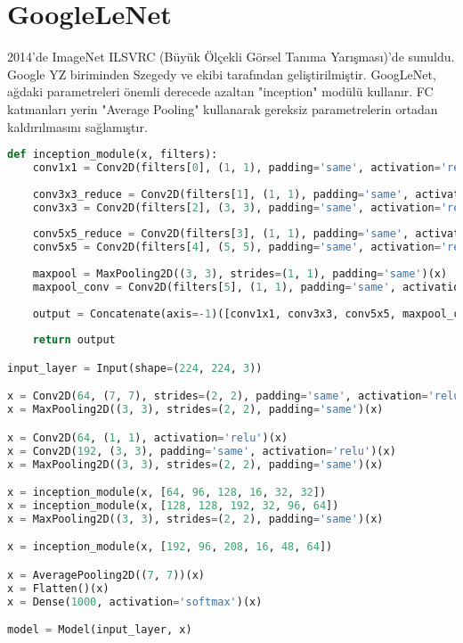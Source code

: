 \section{GoogleLeNet}
2014'de ImageNet ILSVRC (Büyük Ölçekli Görsel Tanıma Yarışması)'de sunuldu. Google YZ biriminden Szegedy ve ekibi tarafından geliştirilmiştir. GoogLeNet, ağdaki parametreleri önemli derecede azaltan "inception" modülü kullanır. FC katmanları yerin "Average Pooling" kullanarak gereksiz parametrelerin ortadan kaldırılmasını sağlamıştır.

\begin{lstlisting}[language=Python]
def inception_module(x, filters):
    conv1x1 = Conv2D(filters[0], (1, 1), padding='same', activation='relu')(x)
    
    conv3x3_reduce = Conv2D(filters[1], (1, 1), padding='same', activation='relu')(x)
    conv3x3 = Conv2D(filters[2], (3, 3), padding='same', activation='relu')(conv3x3_reduce)
    
    conv5x5_reduce = Conv2D(filters[3], (1, 1), padding='same', activation='relu')(x)
    conv5x5 = Conv2D(filters[4], (5, 5), padding='same', activation='relu')(conv5x5_reduce)
    
    maxpool = MaxPooling2D((3, 3), strides=(1, 1), padding='same')(x)
    maxpool_conv = Conv2D(filters[5], (1, 1), padding='same', activation='relu')(maxpool)
    
    output = Concatenate(axis=-1)([conv1x1, conv3x3, conv5x5, maxpool_conv])
    
    return output

input_layer = Input(shape=(224, 224, 3))

x = Conv2D(64, (7, 7), strides=(2, 2), padding='same', activation='relu')(input_layer)
x = MaxPooling2D((3, 3), strides=(2, 2), padding='same')(x)

x = Conv2D(64, (1, 1), activation='relu')(x)
x = Conv2D(192, (3, 3), padding='same', activation='relu')(x)
x = MaxPooling2D((3, 3), strides=(2, 2), padding='same')(x)

x = inception_module(x, [64, 96, 128, 16, 32, 32])
x = inception_module(x, [128, 128, 192, 32, 96, 64])
x = MaxPooling2D((3, 3), strides=(2, 2), padding='same')(x)

x = inception_module(x, [192, 96, 208, 16, 48, 64])

x = AveragePooling2D((7, 7))(x)
x = Flatten()(x)
x = Dense(1000, activation='softmax')(x) 

model = Model(input_layer, x)
\end{lstlisting}

\newpage